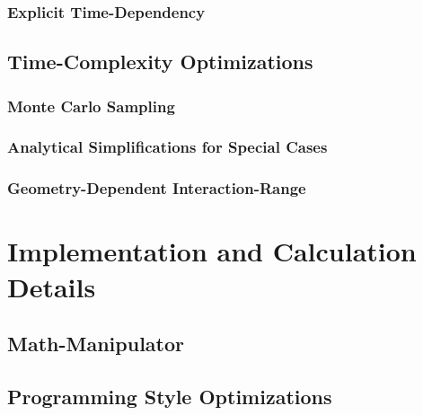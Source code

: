 \documentclass[
headings=optiontohead,              %
12pt,                               %
DIV=13,                             %
twoside=false,                      %
open=right,                         %
BCOR=00mm,                          %
toc=bibliographynumbered            %
]{scrreport}
\begin{document}
        
        \subsection{Explicit Time-Dependency}
        \label{sec:theory-variational-classical-networks-time-dependency}
        
        \FloatBarrier


    \section{Time-Complexity Optimizations}
    \label{sec:theory-optimizations}
    
    \FloatBarrier

        \subsection{Monte Carlo Sampling}
        \label{sec:theory-optimizations-monte-carlo}
        
        \FloatBarrier

        \subsection{Analytical Simplifications for Special Cases}
        \label{sec:theory-optimizations-analytical}
        
        \FloatBarrier

        \subsection{Geometry-Dependent Interaction-Range}
        \label{sec:theory-optimizations-geometry}
        
        \FloatBarrier
        

\chapter{Implementation and Calculation Details}
\label{sec:implementation-details}

\FloatBarrier

    \section{Math-Manipulator}
    \cite{compilersDragonBook}

    \section{Programming Style Optimizations}
\end{document}
